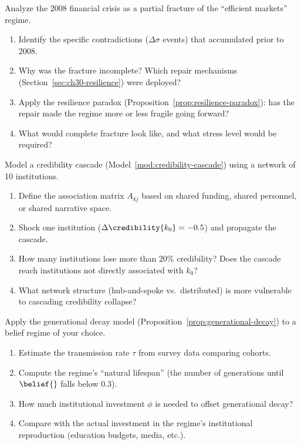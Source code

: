 \begin{exercise}
Analyze the 2008 financial crisis as a partial fracture of the ``efficient markets'' regime.
\begin{enumerate}[nosep]
  \item Identify the specific contradictions ($\Delta\sigma$ events) that accumulated prior to 2008.
  \item Why was the fracture incomplete? Which repair mechanisms (Section~\ref{sec:ch30-resilience}) were deployed?
  \item Apply the resilience paradox (Proposition~\ref{prop:resilience-paradox}): has the repair made the regime more or less fragile going forward?
  \item What would complete fracture look like, and what stress level would be required?
\end{enumerate}
\end{exercise}

\begin{exercise}
Model a credibility cascade (Model~\ref{mod:credibility-cascade}) using a network of 10 institutions.
\begin{enumerate}[nosep]
  \item Define the association matrix $A_{kj}$ based on shared funding, shared personnel, or shared narrative space.
  \item Shock one institution ($\Delta\credibility{k_0} = -0.5$) and propagate the cascade.
  \item How many institutions lose more than 20\% credibility? Does the cascade reach institutions not directly associated with $k_0$?
  \item What network structure (hub-and-spoke vs.\ distributed) is more vulnerable to cascading credibility collapse?
\end{enumerate}
\end{exercise}

\begin{exercise}
Apply the generational decay model (Proposition~\ref{prop:generational-decay}) to a belief regime of your choice.
\begin{enumerate}[nosep]
  \item Estimate the transmission rate $\tau$ from survey data comparing cohorts.
  \item Compute the regime's ``natural lifespan'' (the number of generations until $\belief{}$ falls below 0.3).
  \item How much institutional investment $\phi$ is needed to offset generational decay?
  \item Compare with the actual investment in the regime's institutional reproduction (education budgets, media, etc.).
\end{enumerate}
\end{exercise}

